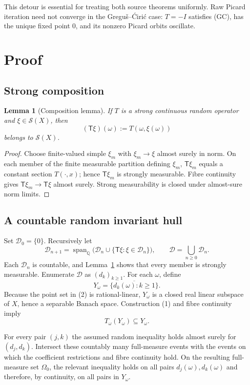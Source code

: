 \documentclass[11pt]{article}
\newtheorem{lemma}[theorem]{Lemma}
\newcommand{\Q}{\mathbb Q}
\newcommand{\cS}{\mathcal S}
\newcommand{\Tstar}{\mathsf T}
\begin{document}
This detour is essential for treating both source theorems uniformly.  Raw
Picard iteration need not converge in the Gregu\v{s}--\'{C}iri\'{c} case:
$T=-I$ satisfies (GC), has the unique fixed point $0$, and its nonzero Picard
orbits oscillate.

\section{Proof}

\subsection{Strong composition}

\begin{lemma}[Composition lemma]\label{lem:composition}
If $T$ is a strong continuous random operator and
$\xi\in\cS(X)$, then
\[
 (\Tstar\xi)(\omega):=T(\omega,\xi(\omega))
\]
belongs to $\cS(X)$.
\end{lemma}

\begin{proof}
Choose finite-valued simple $\xi_m$ with $\xi_m\to\xi$ almost surely in
norm.  On each member of the finite measurable partition defining $\xi_m$,
$\Tstar\xi_m$ equals a constant section $T(\cdot,x)$; hence
$\Tstar\xi_m$ is strongly measurable.  Fibre continuity gives
$\Tstar\xi_m\to\Tstar\xi$ almost surely.  Strong measurability is closed under
almost-sure norm limits.
\end{proof}

\subsection{A countable random invariant hull}

Set $\mathcal D_0=\{0\}$.  Recursively let
\[
 \mathcal D_{n+1}
 =\operatorname{span}_{\Q}
   \bigl(\mathcal D_n\cup\{\Tstar\xi:\xi\in\mathcal D_n\}\bigr),
 \qquad
 \mathcal D=\bigcup_{n\ge0}\mathcal D_n.
 \tag{1}
\]
Each $\mathcal D_n$ is countable, and Lemma~\ref{lem:composition} shows that
every member is strongly measurable.  Enumerate $\mathcal D$ as
$(d_k)_{k\ge1}$.  For each $\omega$, define
\[
 Y_\omega=\overline{\{d_k(\omega):k\ge1\}}.
 \tag{2}
\]
Because the point set in (2) is rational-linear, $Y_\omega$ is a closed real
linear subspace of $X$, hence a separable Banach space.  Construction (1) and
fibre continuity imply
\[
 T_\omega(Y_\omega)\subseteq Y_\omega.
 \tag{3}
\]

For every pair $(j,k)$ the assumed random inequality holds almost surely for
$(d_j,d_k)$.  Intersect these countably many full-measure events with the
events on which the coefficient restrictions and fibre continuity hold.  On
the resulting full-measure set $\Omega_0$, the relevant inequality holds on
all pairs $d_j(\omega),d_k(\omega)$ and therefore, by continuity, on all pairs
in $Y_\omega$.
\end{document}
